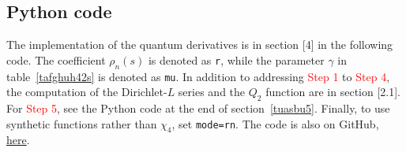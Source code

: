 \documentclass[oneside,10pt]{book}
\begin{document}
\subsection{Python code}\label{l4code}

The implementation of the quantum derivatives is in section [4] in the following code. The coefficient
 $\rho_n(s)$ is denoted as \texttt{r}, while the parameter $\gamma$ in table~\ref{tafghuh42s} is denoted as \texttt{mu}.
In addition to addressing \textcolor{red}{Step 1} to \textcolor{red}{Step 4}, the computation of the Dirichlet-$L$ series  
 and the $Q_2$ function are in section [2.1]. For \textcolor{red}{Step 5}, see the Python code at the end of section~\ref{tuasbu5}.
Finally, to use synthetic functions rather than $\chi_4$, set \texttt{mode=\textquotesingle rn\textquotesingle}.
The code is also on GitHub, 
\href{https://github.com/VincentGranville/Experimental-Math-Number-Theory/blob/main/Source-Code/Dirichlet_L4_product_fitting.py}{here}.
\vspace{1ex}
\end{document}
